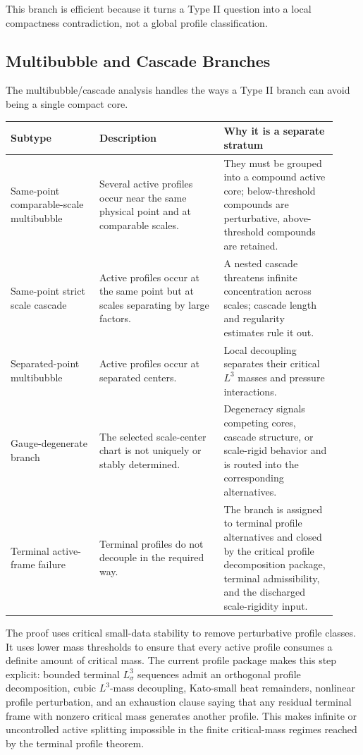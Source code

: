 \documentclass[11pt]{amsart}
\begin{document}
This branch is efficient because it turns a Type II question into a local compactness contradiction, not a global profile classification.

\subsection{Multibubble and Cascade Branches}

The multibubble/cascade analysis handles the ways a Type II branch can avoid being a single compact core.

\begin{longtable}{@{}>{\raggedright\arraybackslash}p{0.25\linewidth}>{\raggedright\arraybackslash}p{0.35\linewidth}>{\raggedright\arraybackslash}p{0.32\linewidth}@{}}
\toprule
\textbf{Subtype} & \textbf{Description} & \textbf{Why it is a separate stratum} \\
\midrule
\endhead
Same-point comparable-scale multibubble & Several active profiles occur near the same physical point and at comparable scales. & They must be grouped into a compound active core; below-threshold compounds are perturbative, above-threshold compounds are retained. \\
Same-point strict scale cascade & Active profiles occur at the same point but at scales separating by large factors. & A nested cascade threatens infinite concentration across scales; cascade length and regularity estimates rule it out. \\
Separated-point multibubble & Active profiles occur at separated centers. & Local decoupling separates their critical \(L^3\) masses and pressure interactions. \\
Gauge-degenerate branch & The selected scale-center chart is not uniquely or stably determined. & Degeneracy signals competing cores, cascade structure, or scale-rigid behavior and is routed into the corresponding alternatives. \\
Terminal active-frame failure & Terminal profiles do not decouple in the required way. & The branch is assigned to terminal profile alternatives and closed by the critical profile decomposition package, terminal admissibility, and the discharged scale-rigidity input. \\
\bottomrule
\end{longtable}

The proof uses critical small-data stability to remove perturbative profile classes.  It uses lower mass thresholds to ensure that every active profile consumes a definite amount of critical mass.  The current profile package makes this step explicit: bounded terminal \(L^3_\sigma\) sequences admit an orthogonal profile decomposition, cubic \(L^3\)-mass decoupling, Kato-small heat remainders, nonlinear profile perturbation, and an exhaustion clause saying that any residual terminal frame with nonzero critical mass generates another profile.  This makes infinite or uncontrolled active splitting impossible in the finite critical-mass regimes reached by the terminal profile theorem.
\end{document}
